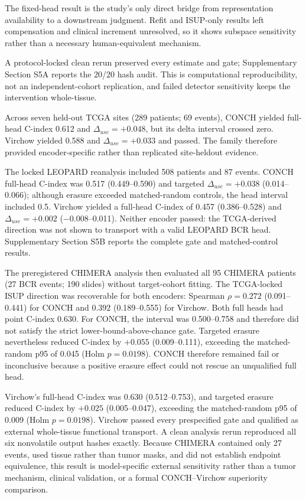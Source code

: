 The fixed-head result is the study's only direct bridge from representation availability to a
downstream judgment. Refit and ISUP-only results left compensation and clinical increment
unresolved, so it shows subspace sensitivity rather than a necessary human-equivalent mechanism.

A protocol-locked clean rerun preserved every estimate and gate; Supplementary Section S5A
reports the 20/20 hash audit. This is computational reproducibility, not an independent-cohort
replication, and failed detector sensitivity keeps the intervention whole-tissue.

Across seven held-out TCGA sites (289 patients; 69 events), CONCH yielded full-head C-index
0.612 and $\Delta_{use}=+0.048$, but its delta interval crossed zero. Virchow yielded 0.588 and
$\Delta_{use}=+0.033$ and passed. The family therefore provided encoder-specific rather than
replicated site-heldout evidence.

The locked LEOPARD reanalysis included 508 patients and 87 events. CONCH full-head C-index
was 0.517 (0.449--0.590) and targeted
$\Delta_{use}=+0.038$ (0.014--0.066); although erasure exceeded matched-random controls, the
head interval included 0.5. Virchow yielded a
full-head C-index of 0.457 (0.386--0.528) and $\Delta_{use}=+0.002$
($-0.008$--0.011). Neither encoder passed: the TCGA-derived direction was not shown to
transport with a valid LEOPARD BCR head.
Supplementary Section S5B reports the complete gate and matched-control results.

The preregistered CHIMERA analysis then evaluated all 95 CHIMERA patients (27 BCR events;
190 slides) without target-cohort fitting. The TCGA-locked ISUP direction was recoverable for
both encoders: Spearman $\rho=0.272$ (0.091--0.441) for CONCH and $0.392$
(0.189--0.555) for Virchow. Both full heads had point C-index 0.630. For CONCH, the interval
was 0.500--0.758 and therefore did not satisfy the strict lower-bound-above-chance gate.
Targeted erasure nevertheless reduced C-index by $+0.055$ (0.009--0.111), exceeding the
matched-random p95 of 0.045 (Holm $p=0.0198$). CONCH therefore remained fail or inconclusive
because a positive erasure effect could not rescue an unqualified full head.

Virchow's full-head C-index was 0.630 (0.512--0.753), and targeted erasure reduced C-index by
$+0.025$ (0.005--0.047), exceeding the matched-random p95 of 0.009
(Holm $p=0.0198$). Virchow passed every prespecified gate and qualified as external
whole-tissue functional transport. A clean analysis rerun reproduced all six nonvolatile
output hashes exactly. Because CHIMERA contained only 27 events, used tissue rather than tumor
masks, and did not establish endpoint equivalence, this result is model-specific external
sensitivity rather than a tumor mechanism, clinical validation, or a formal CONCH--Virchow
superiority comparison.

